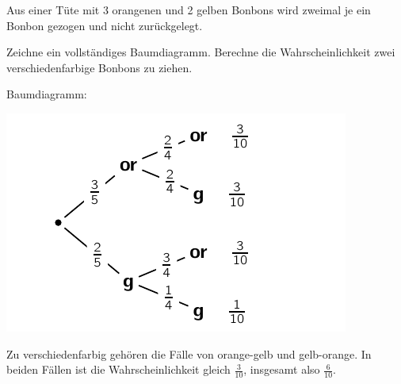 \documentclass[a4paper,12pt]{article}
\begin{document}
\question[5]%
	Aus einer Tüte mit 
	3 orangenen und 2 gelben Bonbons
	wird zweimal je ein Bonbon gezogen und nicht zurückgelegt.
\begin{subparts}
	\subpart Zeichne ein vollständiges Baumdiagramm.
%
	\subpart Berechne die Wahrscheinlichkeit zwei verschiedenfarbige Bonbons zu ziehen.
\end{subparts}

\begin{solution}
\begin{subparts}
	\subpart Baumdiagramm:

	\includegraphics{baumdiagramm}

	\subpart Zu verschiedenfarbig gehören die Fälle von orange-gelb und gelb-orange. In beiden Fällen ist die Wahrscheinlichkeit gleich $\frac{3}{10}$, insgesamt also $\frac{6}{10}$.
\end{subparts}
\end{solution}
\end{document}
